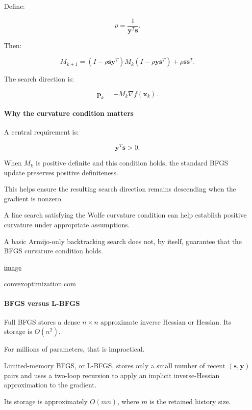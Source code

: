 Define:

\[
\rho=\frac1{\mathbf y^T\mathbf s}.
\]

Then:

\[
\boxed{ M_{k+1} = (I-\rho\mathbf s\mathbf y^T) M_k (I-\rho\mathbf y\mathbf s^T) + \rho\mathbf s\mathbf s^T }.
\]

The search direction is:

\[
\boxed{ \mathbf p_k=-M_k\nabla f(\mathbf x_k) }.
\]

\paragraph{Why the curvature condition matters}\label{02-foundations-ii-ch026-why-the-curvature-condition-matters}

A central requirement is:

\[
\boxed{\mathbf y^T\mathbf s>0}.
\]

When \(M_k\) is positive definite and this condition holds, the standard BFGS update preserves positive definiteness.

This helps ensure the resulting search direction remains descending when the gradient is nonzero.

A line search satisfying the Wolfe curvature condition can help establish positive curvature under appropriate assumptions.

A basic Armijo-only backtracking search does not, by itself, guarantee that the BFGS curvature condition holds. 

\href{https://www.google.com/s2/favicons?domain=https://convexoptimization.com&sz=32}{image}

convexoptimization.com

\paragraph{BFGS versus L-BFGS}\label{02-foundations-ii-ch026-bfgs-versus-l-bfgs}

Full BFGS stores a dense \(n\times n\) approximate inverse Hessian or Hessian. Its storage is \(O(n^2)\).

For millions of parameters, that is impractical.

Limited-memory BFGS, or L-BFGS, stores only a small number of recent \((\mathbf s,\mathbf y)\) pairs and uses a two-loop recursion to apply an implicit inverse-Hessian approximation to the gradient.

Its storage is approximately \(O(mn)\), where \(m\) is the retained history size.

